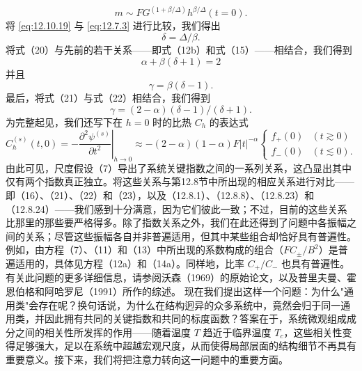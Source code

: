 \begin{equation}\tag{12.10.18}\label{eq:12.10.18}
m \sim F G ^{( 1 + \beta / \Delta )} h ^{\beta / \Delta}  ( t = 0 ) .
\end{equation}
将 \autoref{eq:12.10.19} 与 \autoref{eq:12.7.3} 进行比较，我们得出
\begin{equation}\tag{12.10.19}\label{eq:12.10.19}
\delta = \Delta / \beta .
\end{equation}
将式（20）与先前的若干关系——即式（12b）和式（15）——相结合，我们得到
\begin{equation}\tag{12.10.20}\label{eq:12.10.20}
\alpha + \beta ( \delta + 1 ) = 2
\end{equation}
并且
\begin{equation}\tag{12.10.21}\label{eq:12.10.21}
\gamma = \beta ( \delta - 1 ) .
\end{equation}
最后，将式（21）与式（22）相结合，我们得到
\begin{equation}\tag{12.10.22}\label{eq:12.10.22}
\gamma = ( 2 - \alpha ) ( \delta - 1 ) / ( \delta + 1 ) .
\end{equation}
为完整起见，我们还写下在 \(h=0\) 时的比热 \(C_{h}\) 的表达式
\begin{equation}\tag{12.10.23}\label{eq:12.10.23}
C _ { h } ^{( s )} ( t , 0 ) = - \left. \frac { \partial ^{2} \psi ^{( s )} } { \partial t ^{2} } \right| _ { h \rightarrow 0 } \approx - ( 2 - \alpha ) ( 1 - \alpha ) F | t | ^{- \alpha} \left\{ \begin{array}{ll} { f _ { + } ( 0 ) } & { ( t \gtrsim 0 ) } \\{ f _ { - } ( 0 ) } & { ( t \lesssim 0 ) . } \end{array} \right.
\end{equation}
由此可见，尺度假设（7）导出了系统关键指数之间的一系列关系，这凸显出其中仅有两个指数真正独立。将这些关系与第12.8节中所出现的相应关系进行对比——即（16）、（21）、（22）和（23），以及（12.8.1）、（12.8.8）、（12.8.23）和（12.8.24）——我们感到十分满意，因为它们彼此一致；不过，目前的这些关系比那里的那些要严格得多。除了指数关系之外，我们在此还得到了问题中各振幅之间的关系；尽管这些振幅各自并非普遍适用，但其中某些组合却恰好具有普遍性。例如，由方程（7）、（11）和（13）中所出现的系数构成的组合（\(FC_{\pm}/B^{2}\)）是普遍适用的，具体见方程（12a）和（14a）。同样地，比率 \(C_{+}/C_{-}\) 也具有普遍性。有关此问题的更多详细信息，请参阅沃森（1969）的原始论文，以及普里夫曼、霍恩伯格和阿哈罗尼（1991）所作的综述。
现在我们提出这样一个问题：为什么"通用类"会存在呢？换句话说，为什么在结构迥异的众多系统中，竟然会归于同一通用类，并因此拥有共同的关键指数和共同的标度函数？答案在于，系统微观组成成分之间的相关性所发挥的作用——随着温度 \(T\) 趋近于临界温度 \(T_c\)，这些相关性变得足够强大，足以在系统中超越宏观尺度，从而使得局部层面的结构细节不再具有重要意义。接下来，我们将把注意力转向这一问题中的重要方面。
